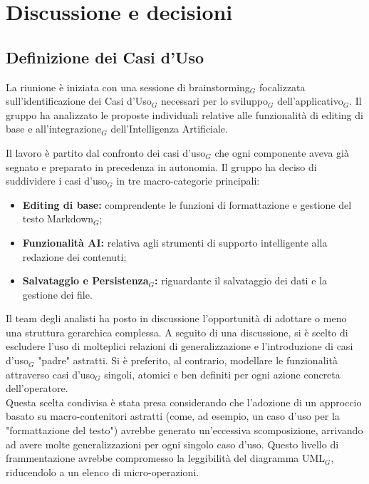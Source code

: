 \documentclass[a4paper, 10pt, colorlinks=true, linkcolor=black, urlcolor=blue, citecolor=blue, hidelinks]{article}
\begin{document}
\section{Discussione e decisioni}
\subsection{Definizione dei Casi d'Uso}
La riunione è iniziata con una sessione di brainstorming$_G$ focalizzata sull'identificazione dei Casi d'Uso$_G$ necessari per lo sviluppo$_G$ dell'applicativo$_G$. Il gruppo ha analizzato le proposte individuali relative alle funzionalità di editing di base e all'integrazione$_G$ dell'Intelligenza Artificiale.

Il lavoro è partito dal confronto dei casi d'uso$_G$ che ogni componente aveva già segnato e preparato in precedenza in autonomia. Il gruppo ha deciso di suddividere i casi d'uso$_G$ in tre macro-categorie principali:
\begin{itemize}
    \item \textbf{Editing di base:} comprendente le funzioni di formattazione e gestione del testo Markdown$_G$;
    \item \textbf{Funzionalità AI:} relativa agli strumenti di supporto intelligente alla redazione dei contenuti;
    \item \textbf{Salvataggio e Persistenza$_G$:} riguardante il salvataggio dei dati e la gestione dei file.
\end{itemize}
Il team degli analisti ha posto in discussione l'opportunità di adottare o meno una struttura gerarchica complessa. A seguito di una discussione, si è scelto di escludere l'uso di molteplici relazioni di generalizzazione e l'introduzione di casi d'uso$_G$ "padre" astratti. Si è preferito, al contrario, modellare le funzionalità attraverso casi d'uso$_G$ singoli, atomici e ben definiti per ogni azione concreta dell'operatore. \\
Questa scelta condivisa è stata presa considerando che l'adozione di un approccio basato su macro-contenitori astratti (come, ad esempio, un caso d'uso per la "formattazione del testo") avrebbe generato un'eccessiva scomposizione, arrivando ad avere molte generalizzazioni per ogni singolo caso d'uso. Questo livello di frammentazione avrebbe compromesso la leggibilità del diagramma UML$_G$, riducendolo a un elenco di micro-operazioni.
\end{document}
